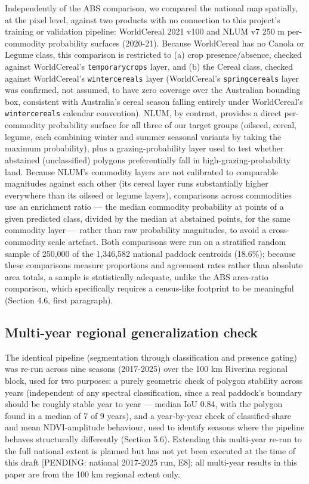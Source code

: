 Independently of the ABS comparison, we compared the national map spatially, at the pixel level, against two products with no connection to this project's training or validation pipeline: WorldCereal 2021 v100 \citep{vantricht2023worldcereal} and NLUM v7 250 m per-commodity probability surfaces (2020-21). Because WorldCereal has no Canola or Legume class, this comparison is restricted to (a) crop presence/absence, checked against WorldCereal's \texttt{temporarycrops} layer, and (b) the Cereal class, checked against WorldCereal's \texttt{wintercereals} layer (WorldCereal's \texttt{springcereals} layer was confirmed, not assumed, to have zero coverage over the Australian bounding box, consistent with Australia's cereal season falling entirely under WorldCereal's \texttt{wintercereals} calendar convention). NLUM, by contrast, provides a direct per-commodity probability surface for all three of our target groups (oilseed, cereal, legume, each combining winter and summer seasonal variants by taking the maximum probability), plus a grazing-probability layer used to test whether abstained (unclassified) polygons preferentially fall in high-grazing-probability land. Because NLUM's commodity layers are not calibrated to comparable magnitudes against each other (its cereal layer runs substantially higher everywhere than its oilseed or legume layers), comparisons across commodities use an enrichment ratio --- the median commodity probability at points of a given predicted class, divided by the median at abstained points, for the same commodity layer --- rather than raw probability magnitudes, to avoid a cross-commodity scale artefact. Both comparisons were run on a stratified random sample of 250,000 of the 1,346,582 national paddock centroids (18.6\%); because these comparisons measure proportions and agreement rates rather than absolute area totals, a sample is statistically adequate, unlike the ABS area-ratio comparison, which specifically requires a census-like footprint to be meaningful (Section 4.6, first paragraph).

\subsection{Multi-year regional generalization check}\label{multi-year-regional-generalization-check}

The identical pipeline (segmentation through classification and presence gating) was re-run across nine seasons (2017-2025) over the 100 km Riverina regional block, used for two purposes: a purely geometric check of polygon stability across years (independent of any spectral classification, since a real paddock's boundary should be roughly stable year to year --- median IoU 0.84, with the polygon found in a median of 7 of 9 years), and a year-by-year check of classified-share and mean NDVI-amplitude behaviour, used to identify seasons where the pipeline behaves structurally differently (Section 5.6). Extending this multi-year re-run to the full national extent is planned but has not yet been executed at the time of this draft {[}PENDING: national 2017-2025 run, E8{]}; all multi-year results in this paper are from the 100 km regional extent only.
